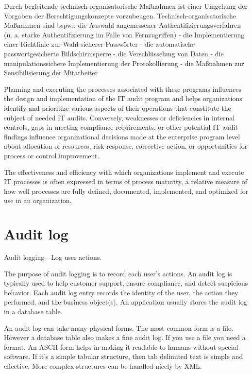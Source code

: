 Durch begleitende technisch-organisatorische Maßnahmen ist einer
Umgehung der Vorgaben der Berechtigungskonzepte vorzubeugen.
Technisch-organisatorische Maßnahmen sind bspw.:
die Auswahl angemessener Authentifizierungsverfahren (u. a. starke
Authentifizierung im Falle von Fernzugriffen)
- die Implementierung einer Richtlinie zur Wahl sicherer Passwörter
- die automatische passwortgesicherte Bildschirmsperre
- die Verschlüsselung von Daten
- die manipulationssichere Implementierung der Protokollierung
- die Maßnahmen zur Sensibilisierung der Mitarbeiter

Planning
and executing the processes associated with these programs influences the design
and implementation of the IT audit program and helps organizations identify and
prioritize various aspects of their operations that constitute the subject of needed
IT audits. Conversely, weaknesses or deficiencies in internal controls, gaps in
meeting compliance requirements, or other potential IT audit findings influence
organizational decisions made at the enterprise program level about allocation of
resources, risk response, corrective action, or opportunities for process or control
improvement.


The effectiveness and efficiency with which organizations implement and execute
IT processes is often expressed in terms of process maturity, a relative measure of
how well processes are fully defined, documented, implemented, and optimized
for use in an organization.

\section{Audit log} 

Audit logging—Log user actions.

The purpose of audit logging is to record each user’s actions. An audit log is typically
used to help customer support, ensure compliance, and detect suspicious behavior.
Each audit log entry records the identity of the user, the action they performed, and
the business object(s). An application usually stores the audit log in a database table.~\citep{richardson2018microservices}


An audit log can take many physical forms. The most common form is a file. However a database table also makes a fine audit log. If you use a file you need a format. An ASCII form helps in making it readable to humans without special software. If it's a simple tabular structure, then tab delimited text is simple and effective. More complex structures can be handled nicely by XML.

